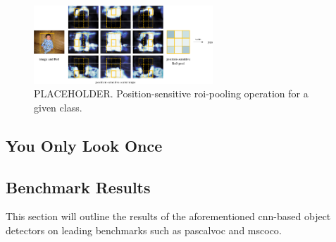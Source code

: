 \begin{figure}[H]
  \centering
    \includegraphics[width=0.6\textwidth]{Figs/Techanal/rfcnpooling.png}
      \caption{PLACEHOLDER. Position-sensitive \gls{roi}-pooling operation for a given class.}
    \label{fig:rfcnpooling}
\end{figure}

\subsection{You Only Look Once}

\subsection{Benchmark Results}

This section will outline the results of the aforementioned \gls{cnn}-based object detectors on leading benchmarks such as \gls{pascalvoc} and \gls{mscoco}.
